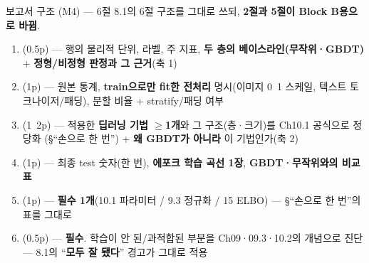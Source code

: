\begin{frame}{보고서 구조 (M4) — 6절}
  8.1의 6절 구조를 그대로 쓰되, \textbf{2절과 5절이 Block B용으로
  바뀜}.
  \begin{enumerate}
    \item {}(0.5p) — 행의 물리적 단위, 라벨, 주 지표,
      \textbf{두 층의 베이스라인(무작위·GBDT)} + \textbf{정형/비정형
      판정과 그 근거}(축 1)
    \item {}(1p) — 원본 통계, \textbf{train으로만
      fit한 전처리} 명시(이미지 0~1 스케일, 텍스트 토크나이저/패딩),
      분할 비율 + stratify/패딩 여부
    \item {}(1~2p) — 적용한 \textbf{딥러닝 기법
      $\geq$1개}와 그 구조(층·크기)를 Ch10.1 공식으로 정당화
      (§``손으로 한 번'') + \textbf{왜 GBDT가 아니라} 이 기법인가(축 2)
    \item {}(1p) — 최종 test 숫자(한 번), \textbf{에포크 학습
      곡선 1장}, \textbf{GBDT·무작위와의 비교 표}
    \item {}(1p) — \textbf{필수 1개}(10.1 파라미터 /
      9.3 정규화 / 15 ELBO) — §``손으로 한 번''의 표를 그대로
    \item {}(0.5p) — \textbf{필수}.
      학습이 안 된/과적합된 부분을 Ch09·09.3·10.2의 개념으로 진단 —
      8.1의 ``\textbf{모두 잘 됐다}'' 경고가 그대로 적용
  \end{enumerate}
\end{frame}
